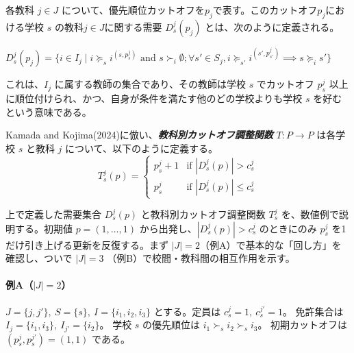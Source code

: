 \documentclass[12pt, a4paper]{article}
\theoremstyle{definition}
\theoremstyle{remark}
\theoremstyle{plain}
\begin{document}

各教科 $j \in J$ について、優先順位カットオフを$p_j$で表す。このカットオフ$p_j$における学校 $s$ の教科$j \in J$に関する需要 $D^j_s(p_j)$ とは、次のように定義される。

$D^j_s(p_j) = \{ i \in I_j \mid i \succeq_s i^{(s,p^j_s)} \text{ and } s \succ_i \emptyset; \forall s' \in S_j, i \succeq_{s'} i^{(s',p^j_{s'})} \implies s \succeq_i s' \}$

これは、$I_j$ に属する教師の集合であり、その教師は学校 $s$ でカットオフ $p^j_s$ 以上に順位付けられ、かつ、自身が条件を満たす他のどの学校よりも学校 $s$ を好むという意味である。

Kamada and Kojima(2024)に倣い、\textbf{\textit{教科別カットオフ調整関数}} $T : P \rightarrow P$ は各学校 $s$ と教科 $j$ について、以下のように定義する。
\[
T_s^j(p) =
\begin{cases}
p_s^j + 1 & \text{if } | D_s^j(p) | > c^j_s \\
p_s^j     & \text{if } | D_s^j(p) | \leq c^j_s
\end{cases}
\]




\noindent 上で定義した需要集合 $D^j_s(p)$ と教科別カットオフ調整関数 $T^j_s$ を、数値例で説明する。初期値 $p=(1,\dots,1)$ から出発し、$|D^j_s(p)|>c^j_s$ のときにのみ $p^j_s$ を1だけ引き上げる更新を反復する。まず $|J|=2$（例A）で基本的な「回し方」を確認し、ついで $|J|=3$ （例B）で校間・教科間の相互作用を示す。


\paragraph{例A（\(|J|=2\)）}
\(
J=\{j,j'\},\ S=\{s\},\ I=\{i_1,i_2,i_3\}
\) とする。定員は
\(
c^j_s=1,\ c^{j'}_s=1
\)。
免許集合は
\(
I_j=\{i_1,i_3\},\ I_{j'}=\{i_2\}
\)。
学校 \(s\) の優先順位は
\(
i_1 \succ_s i_2 \succ_s i_3
\)。
初期カットオフは
\(
(p^j_s,p^{j'}_s)=(1,1)
\)
である。

\end{document}
